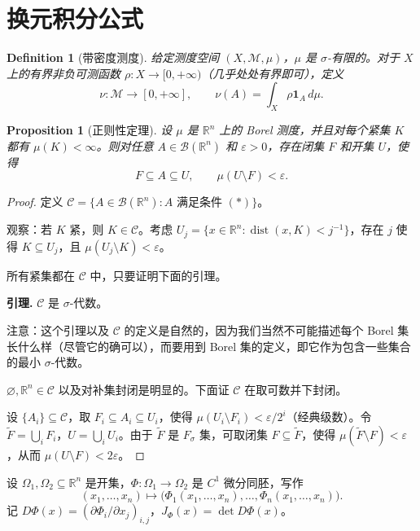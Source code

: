 \documentclass[12pt,letterpaper,twoside,openright]{ctexbook}
\theoremstyle{bluehead}
\newtheorem{proposition}[theorem]{Proposition}
\theoremstyle{olivehead}
\newtheorem{definition}{Definition}
\theoremstyle{orangehead}
\theoremstyle{redremark}
\begin{document}
\section{换元积分公式}

\begin{definition}[带密度测度]
给定测度空间 $(X,\mathcal M,\mu)$，$\mu$ 是 $\sigma$-有限的。对于 $X$ 上的有界非负可测函数 $\rho:X\to[0,+\infty)$（几乎处处有界即可），定义
\[
\nu:\mathcal M\to[0,+\infty],\qquad
\nu(A)=\int_X\rho\mathbf1_A\,d\mu.
\]
\end{definition}

\begin{proposition}[正则性定理]\label{prop:borel-regularity-change-variables}
设 $\mu$ 是 $\mathbb R^n$ 上的 Borel 测度，并且对每个紧集 $K$ 都有 $\mu(K)<\infty$。则对任意 $A\in\mathcal B(\mathbb R^n)$ 和 $\varepsilon>0$，存在闭集 $F$ 和开集 $U$，使得
\[
F\subseteq A\subseteq U,\qquad \mu(U\setminus F)<\varepsilon.\tag{*}
\]
\end{proposition}
\begin{proof}
定义 $\mathcal C=\{A\in\mathcal B(\mathbb R^n):A\text{ 满足条件 }(*)\}$。

观察：若 $K$ 紧，则 $K\in\mathcal C$。考虑 $U_j=\{x\in\mathbb R^n:\operatorname{dist}(x,K)<j^{-1}\}$，存在 $j$ 使得 $K\subseteq U_j$，且 $\mu(U_j\setminus K)<\varepsilon$。

所有紧集都在 $\mathcal C$ 中，只要证明下面的引理。

\textbf{引理.} $\mathcal C$ 是 $\sigma$-代数。

注意：这个引理以及 $\mathcal C$ 的定义是自然的，因为我们当然不可能描述每个 Borel 集长什么样（尽管它的确可以），而要用到 Borel 集的定义，即它作为包含一些集合的最小 $\sigma$-代数。

$\varnothing,\mathbb R^n\in\mathcal C$ 以及对补集封闭是明显的。下面证 $\mathcal C$ 在取可数并下封闭。

设 $\{A_i\}\subseteq\mathcal C$，取 $F_i\subseteq A_i\subseteq U_i$，使得 $\mu(U_i\setminus F_i)<\varepsilon/2^i$（经典级数）。令 $\widetilde F=\bigcup_iF_i$，$U=\bigcup_iU_i$。由于 $\widetilde F$ 是 $F_\sigma$ 集，可取闭集 $F\subseteq\widetilde F$，使得 $\mu(\widetilde F\setminus F)<\varepsilon$，从而 $\mu(U\setminus F)<2\varepsilon$。
\end{proof}

设 $\Omega_1,\Omega_2\subseteq\mathbb R^n$ 是开集，$\Phi:\Omega_1\to\Omega_2$ 是 $C^1$ 微分同胚，写作
\[
(x_1,\ldots,x_n)\longmapsto
\bigl(\Phi_1(x_1,\ldots,x_n),\ldots,\Phi_n(x_1,\ldots,x_n)\bigr).
\]
记 $D\Phi(x)=(\partial\Phi_i/\partial x_j)_{i,j}$，$J_\Phi(x)=\det D\Phi(x)$。
\end{document}
